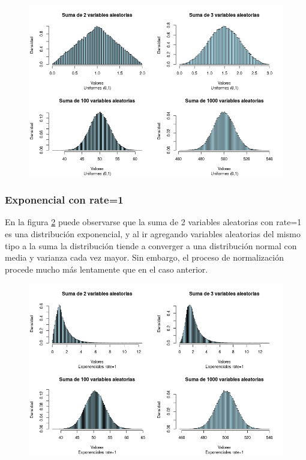 \documentclass[paper=letter, fontsize=11pt]{scrartcl}
\numberwithin{equation}{section} %
\numberwithin{figure}{section} %
\numberwithin{table}{section} %
\begin{document}
\begin{figure}[htpb]
\centering
  \includegraphics[height=.5\linewidth]{uniforme.png}
  \label{fig1}
\end{figure}

\subsubsection{Exponencial con rate=1}
En la figura \ref{fig2} puede observarse que la suma de 2 variables aleatorias con rate=1 es una distribuci\'on exponencial, y al ir agregando variables aleatorias del mismo tipo a la suma la distribuci\'on tiende a converger a una distribuci\'on normal con media y varianza cada vez mayor. Sin embargo, el proceso de normalizaci\'on procede mucho m\'as lentamente que en el caso anterior.

\begin{figure}[htpb]
\centering
  \includegraphics[height=.5\linewidth]{exponenciales.png}
  \label{fig2}
\end{figure}
\end{document}
